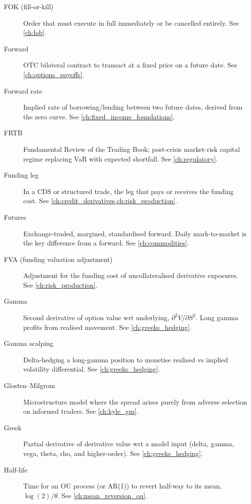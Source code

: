 \begin{description}
\item[FOK (fill-or-kill)]
Order that must execute in full immediately or be cancelled entirely.
See \cref{ch:lob}.

\item[Forward]
OTC bilateral contract to transact at a fixed price on a future date. See \cref{ch:options_payoffs}.

\item[Forward rate]
Implied rate of borrowing/lending between two future dates, derived
from the zero curve. See \cref{ch:fixed_income_foundations}.

\item[FRTB]
Fundamental Review of the Trading Book; post-crisis market-risk capital
regime replacing VaR with expected shortfall. See \cref{ch:regulatory}.

\item[Funding leg]
In a CDS or structured trade, the leg that pays or receives the
funding cost. See \cref{ch:credit_derivatives,ch:risk_production}.

\item[Futures]
Exchange-traded, margined, standardised forward. Daily mark-to-market
is the key difference from a forward. See \cref{ch:commodities}.

\item[FVA (funding valuation adjustment)]
Adjustment for the funding cost of uncollateralised derivative
exposures. See \cref{ch:risk_production}.

\item[Gamma]
Second derivative of option value wrt underlying, $\partial^2
V/\partial S^2$. Long gamma profits from realised movement. See \cref{ch:greeks_hedging}.

\item[Gamma scalping]
Delta-hedging a long-gamma position to monetise realised vs implied
volatility differential. See \cref{ch:greeks_hedging}.

\item[Glosten--Milgrom]
Microstructure model where the spread arises purely from adverse
selection on informed traders. See \cref{ch:kyle_gm}.

\item[Greek]
Partial derivative of derivative value wrt a model input (delta, gamma,
vega, theta, rho, and higher-order). See \cref{ch:greeks_hedging}.

\item[Half-life]
Time for an OU process (or AR(1)) to revert half-way to its mean,
$\log(2)/\theta$. See \cref{ch:mean_reversion_ou}.


\end{description}
